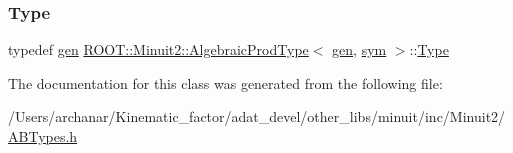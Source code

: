 \mbox{\label{classROOT_1_1Minuit2_1_1AlgebraicProdType_3_01gen_00_01sym_01_4_acdbf9062d11987f3a1cb857a95ef2669}} 
\subsubsection{\texorpdfstring{Type}{Type}\hspace{0.1cm}{\footnotesize\ttfamily [2/2]}}
{\footnotesize\ttfamily typedef \mbox{\hyperlink{classROOT_1_1Minuit2_1_1gen}{gen}} \mbox{\hyperlink{classROOT_1_1Minuit2_1_1AlgebraicProdType}{R\+O\+O\+T\+::\+Minuit2\+::\+Algebraic\+Prod\+Type}}$<$ \mbox{\hyperlink{classROOT_1_1Minuit2_1_1gen}{gen}}, \mbox{\hyperlink{classROOT_1_1Minuit2_1_1sym}{sym}} $>$\+::\mbox{\hyperlink{classROOT_1_1Minuit2_1_1AlgebraicProdType_3_01gen_00_01sym_01_4_acdbf9062d11987f3a1cb857a95ef2669}{Type}}}



The documentation for this class was generated from the following file\+:\begin{DoxyCompactItemize}
\item 
/\+Users/archanar/\+Kinematic\+\_\+factor/adat\+\_\+devel/other\+\_\+libs/minuit/inc/\+Minuit2/\mbox{\hyperlink{other__libs_2minuit_2inc_2Minuit2_2ABTypes_8h}{A\+B\+Types.\+h}}\end{DoxyCompactItemize}
